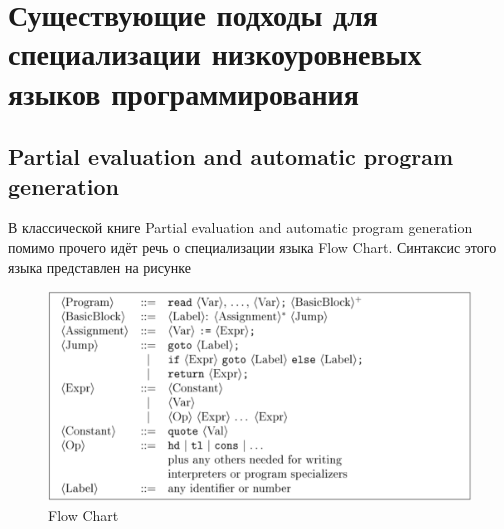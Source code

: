 \section{Существующие подходы для специализации низкоуровневых языков программирования}

\subsection{Partial evaluation and automatic program generation}
В классической книге Partial evaluation and automatic program generation \cite{PEAPG} помимо прочего идёт речь о специализации языка Flow Chart. Синтаксис этого языка представлен на рисунке %
\begin{figure}[h]
\includegraphics[width=0.8\linewidth]{Kravchenko/Pic1.png}
\caption{ Flow Chart}
\label{fig:flow}
\end{figure}




